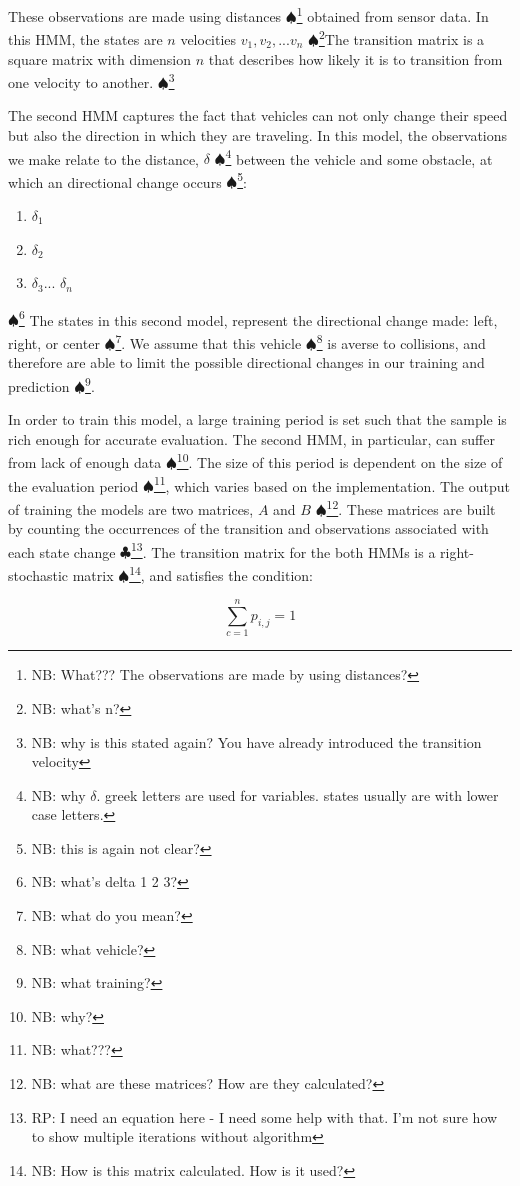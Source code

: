 \documentclass[conference]{IEEEtran}
\newcommand\NB[1]{$\spadesuit$\footnote{NB: #1}}
\newcommand\RP[1]{$\clubsuit$\footnote{RP: #1}}
\begin{document}
These observations are made using distances \NB{What??? The observations are made by using distances?} obtained from sensor data. In this HMM, the states are $n$ velocities $v_1,v_2,...v_{n}$ \NB{what's n?}The transition matrix is a square matrix with dimension $n$ that describes how likely it is to transition from one velocity to another. \NB{why is this stated again? You have already introduced the transition velocity}

The second HMM captures the fact that vehicles can not only change their speed but also the direction in which they are traveling. In this model, the observations we make relate to the distance, $\delta$ \NB{why $\delta$. greek letters are used for variables. states usually are with lower case letters. } between the vehicle and some obstacle, at which an directional change occurs \NB{this is again not clear?}:
\begin{enumerate}
    \item $\delta_1$
    \item $\delta_2$
    \item $\delta_3$... $\delta_n$
\end{enumerate}
\NB{what's delta 1 2 3?}
The states in this second model, represent the directional change made: left, right, or center \NB{what do you mean? }. We assume that this vehicle \NB{what vehicle?} is averse to collisions, and therefore are able to limit the possible directional changes in our training and prediction \NB{what training?}.

In order to train this model, a large training period is set such that the sample is rich enough for accurate evaluation. The second HMM, in particular, can suffer from lack of enough data \NB{why?}. The size of this period is dependent on the size of the evaluation period \NB{what???}, which varies based on the implementation. The output of training the models are two matrices, $A$ and $B$ \NB{what are these matrices? How are they calculated?}. These matrices are built by counting the occurrences of the transition and observations associated with each state change \RP{I need an equation here - I need some help with that. I'm not sure how to show multiple iterations without algorithm}. The transition matrix for the both HMMs is a right-stochastic matrix \NB{How is this matrix calculated. How is it used?}, and satisfies the condition:

\begin{equation} \label{probsum}
    \sum_{c=1}^{n}p_{i,j} = 1
\end{equation}
\end{document}
